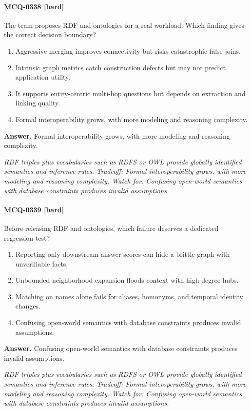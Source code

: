 \paragraph{MCQ-0338 [hard]} The team proposes RDF and ontologies for a real workload. Which finding gives the correct decision boundary?
\begin{enumerate}[label=\Alph*.]
\item Aggressive merging improves connectivity but risks catastrophic false joins.
\item Intrinsic graph metrics catch construction defects but may not predict application utility.
\item It supports entity-centric multi-hop questions but depends on extraction and linking quality.
\item Formal interoperability grows, with more modeling and reasoning complexity.
\end{enumerate}
\noindent\textbf{Answer.} Formal interoperability grows, with more modeling and reasoning complexity.
\par\textit{RDF triples plus vocabularies such as RDFS or OWL provide globally identified semantics and inference rules. Tradeoff: Formal interoperability grows, with more modeling and reasoning complexity. Watch for: Confusing open-world semantics with database constraints produces invalid assumptions.}
\paragraph{MCQ-0339 [hard]} Before releasing RDF and ontologies, which failure deserves a dedicated regression test?
\begin{enumerate}[label=\Alph*.]
\item Reporting only downstream answer scores can hide a brittle graph with unverifiable facts.
\item Unbounded neighborhood expansion floods context with high-degree hubs.
\item Matching on names alone fails for aliases, homonyms, and temporal identity changes.
\item Confusing open-world semantics with database constraints produces invalid assumptions.
\end{enumerate}
\noindent\textbf{Answer.} Confusing open-world semantics with database constraints produces invalid assumptions.
\par\textit{RDF triples plus vocabularies such as RDFS or OWL provide globally identified semantics and inference rules. Tradeoff: Formal interoperability grows, with more modeling and reasoning complexity. Watch for: Confusing open-world semantics with database constraints produces invalid assumptions.}
